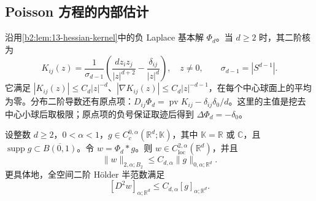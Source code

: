 \subsection{Poisson 方程的内部估计}
\label{b2:subsec:160502}

沿用\cref{b2:lem:13-hessian-kernel}中的负 Laplace 基本解 \(\Phi_d\)。当 \(d\ge2\) 时，其二阶核为
\[
 K_{ij}(z)=\frac1{\sigma_{d-1}}
 \left(\frac{dz_iz_j}{|z|^{d+2}}-\frac{\delta_{ij}}{|z|^d}\right),
 \quad z\ne0,\qquad \sigma_{d-1}=|S^{d-1}|.
\]
它满足 \(|K_{ij}(z)|\le C_d|z|^{-d}\)、\(|\nabla K_{ij}(z)|\le C_d|z|^{-d-1}\)，在每个中心球面上的平均为零。分布二阶导数还有原点项：\(D_{ij}\Phi_d=\operatorname{pv}K_{ij}-\delta_{ij}\delta_0/d\)。这里的主值是挖去中心小球后取极限；原点项的负号保证取迹后得到 \(\Delta\Phi_d=-\delta_0\)。

\begin{lemma}
\label{b2:lem:18-newton-schauder}
设整数 \(d\ge2\)，\(0<\alpha<1\)，\(g\in C_c^{0,\alpha}(\mathbb R^d;\mathbb K)\)，其中 \(\mathbb K=\mathbb R\) 或 \(\mathbb C\)，且 \(\operatorname{supp}g\subset\overline{B(0,1)}\)。令 \(w=\Phi_d*g\)。则 \(w\in C^{2,\alpha}_{\mathrm{loc}}(\mathbb R^d)\)，并且
\[
 \|w\|_{2,\alpha;B_2}\le C_{d,\alpha}\|g\|_{0,\alpha;\mathbb R^d}.
\]
更具体地，全空间二阶 Hölder 半范数满足
\[
 [D^2w]_{\alpha;\mathbb R^d}\le C_{d,\alpha}[g]_{\alpha;\mathbb R^d}.
\]
\end{lemma}
